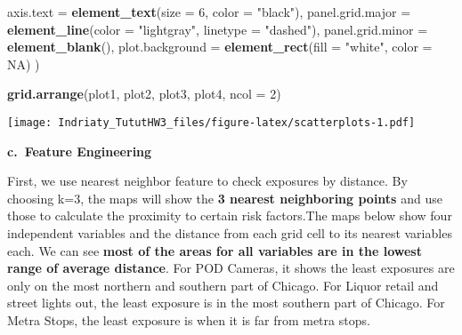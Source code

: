 \documentclass[
]{article}
\newenvironment{Shaded}{\begin{snugshade}}{\end{snugshade}}
\newcommand{\AttributeTok}[1]{\textcolor[rgb]{0.13,0.29,0.53}{#1}}
\newcommand{\ConstantTok}[1]{\textcolor[rgb]{0.56,0.35,0.01}{#1}}
\newcommand{\DecValTok}[1]{\textcolor[rgb]{0.00,0.00,0.81}{#1}}
\newcommand{\FunctionTok}[1]{\textcolor[rgb]{0.13,0.29,0.53}{\textbf{#1}}}
\newcommand{\NormalTok}[1]{#1}
\newcommand{\StringTok}[1]{\textcolor[rgb]{0.31,0.60,0.02}{#1}}
\begin{document}
\begin{Shaded}
\begin{Highlighting}[]
    \AttributeTok{axis.text =} \FunctionTok{element\_text}\NormalTok{(}\AttributeTok{size =} \DecValTok{6}\NormalTok{, }\AttributeTok{color =} \StringTok{"black"}\NormalTok{),}
    \AttributeTok{panel.grid.major =} \FunctionTok{element\_line}\NormalTok{(}\AttributeTok{color =} \StringTok{"lightgray"}\NormalTok{, }\AttributeTok{linetype =} \StringTok{"dashed"}\NormalTok{),}
    \AttributeTok{panel.grid.minor =} \FunctionTok{element\_blank}\NormalTok{(),}
    \AttributeTok{plot.background =} \FunctionTok{element\_rect}\NormalTok{(}\AttributeTok{fill =} \StringTok{"white"}\NormalTok{, }\AttributeTok{color =} \ConstantTok{NA}\NormalTok{)}
\NormalTok{  )}

\FunctionTok{grid.arrange}\NormalTok{(plot1, plot2, plot3, plot4, }\AttributeTok{ncol =} \DecValTok{2}\NormalTok{)}
\end{Highlighting}
\end{Shaded}

\texttt{[image: Indriaty\_TututHW3\_files/figure-latex/scatterplots-1.pdf]}

\textbf{c.~Feature Engineering}

First, we use nearest neighbor feature to check exposures by distance.
By choosing k=3, the maps will show the \textbf{3 nearest neighboring
points} and use those to calculate the proximity to certain risk
factors.The maps below show four independent variables and the distance
from each grid cell to its nearest variables each. We can see
\textbf{most of the areas for all variables are in the lowest range of
average distance}. For POD Cameras, it shows the least exposures are
only on the most northern and southern part of Chicago. For Liquor
retail and street lights out, the least exposure is in the most southern
part of Chicago. For Metra Stops, the least exposure is when it is far
from metra stops.
\end{document}
